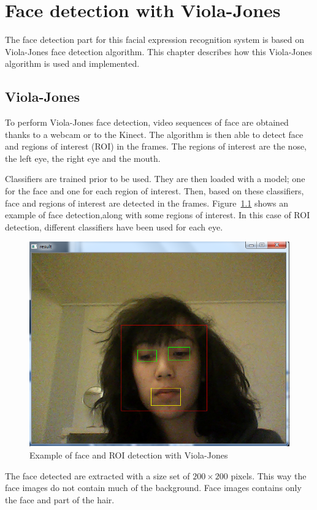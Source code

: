 \chapter{Face detection with Viola-Jones}
\label{chap:implementation_violajones}

\noindent The face detection part for this facial expression recognition system is based on Viola-Jones face detection algorithm. This chapter describes how this Viola-Jones algorithm is used and implemented.
\newline

\section{Viola-Jones}

\vspace{\baselineskip}
\noindent To perform Viola-Jones face detection, video sequences of face are obtained thanks to a webcam or to the Kinect. The algorithm is then able to detect face and regions of interest (ROI) in the frames. The regions of interest are the nose, the left eye, the right eye and the mouth. 
\newline

\noindent Classifiers are trained prior to be used. They are then loaded with a model; one for the face and one for each region of interest. Then, based on these classifiers, face and regions of interest are detected in the frames. Figure~\ref{violajones_implementation_example} shows an example of face detection,along with some regions of interest. In this case of ROI detection, different classifiers have been used for each eye. 
\newline

\begin{figure}[!h]
\begin{center}
\noindent \includegraphics[scale=0.4]{figures/violajones_implementation_example} 
\newline
\caption{Example of face and ROI detection with Viola-Jones}
\label{violajones_implementation_example}
\end{center} 
\end{figure}

\noindent The face detected are extracted with a size set of $ 200\times200 $ pixels. This way the face images do not contain much of the background. Face images contains only the face and part of the hair.
\newline